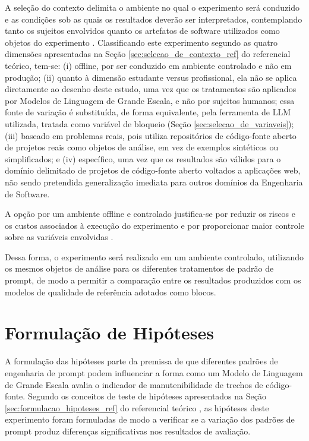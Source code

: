 A seleção do contexto delimita o ambiente no qual o experimento será conduzido e as condições sob as quais os resultados deverão ser interpretados, contemplando tanto os sujeitos envolvidos quanto os artefatos de software utilizados como objetos do experimento \cite{wohlin2024}. Classificando este experimento segundo as quatro dimensões apresentadas na Seção \ref{sec:selecao_de_contexto_ref} do referencial teórico, tem-se: (i) offline, por ser conduzido em ambiente controlado e não em produção; (ii) quanto à dimensão estudante versus profissional, ela não se aplica diretamente ao desenho deste estudo, uma vez que os tratamentos são aplicados por Modelos de Linguagem de Grande Escala, e não por sujeitos humanos; essa fonte de variação é substituída, de forma equivalente, pela ferramenta de LLM utilizada, tratada como variável de bloqueio (Seção \ref{sec:selecao_de_variaveis}); (iii) baseado em problemas reais, pois utiliza repositórios de código-fonte aberto de projetos reais como objetos de análise, em vez de exemplos sintéticos ou simplificados; e (iv) específico, uma vez que os resultados são válidos para o domínio delimitado de projetos de código-fonte aberto voltados a aplicações web, não sendo pretendida generalização imediata para outros domínios da Engenharia de Software.

A opção por um ambiente offline e controlado justifica-se por reduzir os riscos e os custos associados à execução do experimento e por proporcionar maior controle sobre as variáveis envolvidas .

Dessa forma, o experimento será realizado em um ambiente controlado, utilizando os mesmos objetos de análise para os diferentes tratamentos de padrão de prompt, de modo a permitir a comparação entre os resultados produzidos com os modelos de qualidade de referência adotados como blocos.

\section{Formulação de Hipóteses}
\label{sec:formulação_de_hipóteses}

A formulação das hipóteses parte da premissa de que diferentes padrões de engenharia de prompt podem influenciar a forma como um Modelo de Linguagem de Grande Escala avalia o indicador de manutenibilidade de trechos de código-fonte. Segundo os conceitos de teste de hipóteses apresentados na Seção \ref{sec:formulacao_hipoteses_ref} do referencial teórico , as hipóteses deste experimento foram formuladas de modo a verificar se a variação dos padrões de prompt produz diferenças significativas nos resultados de avaliação.


